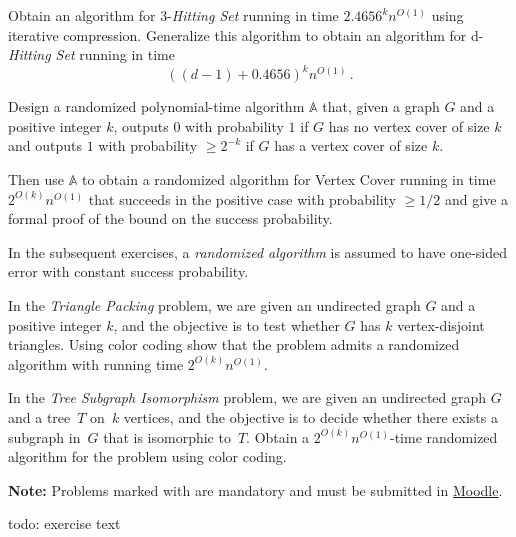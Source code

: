 \documentclass{uebung_cs}
\begin{document}
\begin{exercise}
Obtain an algorithm for 3-\emph{Hitting Set} running in time $2.4656^kn^{O(1)}$ using iterative compression. Generalize this algorithm to obtain an algorithm for d-\emph{Hitting Set} running in time \[((d-1)+0.4656)^kn^{O(1)} \,. \]
\end{exercise}

\begin{exercise}
Design a randomized polynomial-time algorithm $\mathbb{A}$ that, given a graph $G$ and a positive integer $k$, outputs $0$ with probability $1$ if $G$ has no vertex cover of size $k$ and outputs $1$ with probability $\geq 2^{-k}$ if $G$ has a vertex cover of size $k$.

Then use $\mathbb{A}$ to obtain a randomized algorithm for Vertex Cover running in time $2^{O(k)} n^{O(1)}$ that succeeds in the positive case with probability $\geq 1/2$ and give a formal proof of the bound on the success probability.
\end{exercise}

In the subsequent exercises, a \emph{randomized algorithm} is assumed to have one-sided error with constant success probability.

\begin{exercise}
In the \emph{Triangle Packing} problem, we are given an undirected graph $G$ and a positive integer $k$, and the objective is to test whether $G$ has $k$ vertex-disjoint triangles. Using color coding show that the problem admits a randomized algorithm with running time $2^{O(k)} n^{O(1)}$.
\end{exercise}


\begin{exercise}
In the \emph{Tree Subgraph Isomorphism} problem, we are given an undirected graph $G$ and a tree~$T$ on~$k$ vertices, and the objective is to decide whether there exists a subgraph in~$G$ that is isomorphic to~$T$. Obtain a $2^{O(k)}n^{O(1)}$-time randomized algorithm for the problem using color coding.
\end{exercise}


\textbf{Note:} Problems marked with \mandatory are mandatory and must be submitted in \href{https://moodle.studiumdigitale.uni-frankfurt.de/moodle/course/view.php?id=6259}{Moodle}.

\begin{exercise}
  todo: exercise text
\end{exercise}
\end{document}
